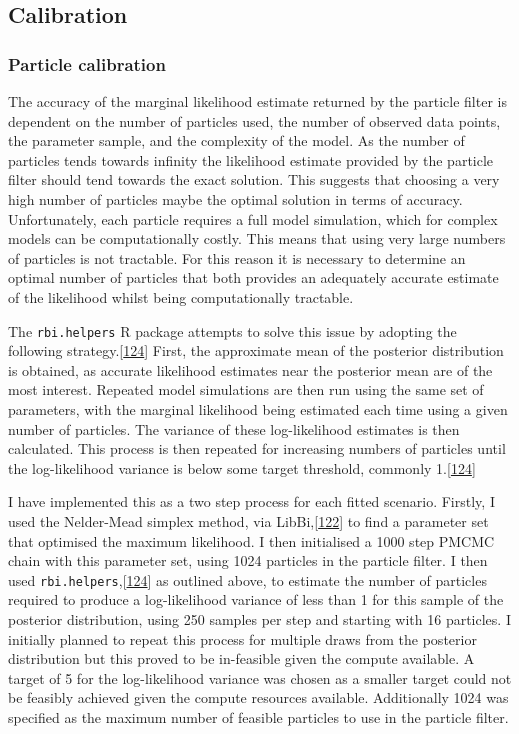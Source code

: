 \documentclass[11pt,twoside]{bristolthesis}
\begin{document}
  \hypertarget{calibration}{%
  \subsection{Calibration}\label{calibration}}
  
  \hypertarget{particle-calibration}{%
  \subsubsection{Particle calibration}\label{particle-calibration}}
  
  The accuracy of the marginal likelihood estimate returned by the particle filter is dependent on the number of particles used, the number of observed data points, the parameter sample, and the complexity of the model. As the number of particles tends towards infinity the likelihood estimate provided by the particle filter should tend towards the exact solution. This suggests that choosing a very high number of particles maybe the optimal solution in terms of accuracy. Unfortunately, each particle requires a full model simulation, which for complex models can be computationally costly. This means that using very large numbers of particles is not tractable. For this reason it is necessary to determine an optimal number of particles that both provides an adequately accurate estimate of the likelihood whilst being computationally tractable.
  
  The \texttt{rbi.helpers} R package attempts to solve this issue by adopting the following strategy.{[}\protect\hyperlink{ref-Funk:2019uw}{124}{]} First, the approximate mean of the posterior distribution is obtained, as accurate likelihood estimates near the posterior mean are of the most interest. Repeated model simulations are then run using the same set of parameters, with the marginal likelihood being estimated each time using a given number of particles. The variance of these log-likelihood estimates is then calculated. This process is then repeated for increasing numbers of particles until the log-likelihood variance is below some target threshold, commonly 1.{[}\protect\hyperlink{ref-Funk:2019uw}{124}{]}
  
  I have implemented this as a two step process for each fitted scenario. Firstly, I used the Nelder-Mead simplex method, via LibBi,{[}\protect\hyperlink{ref-Murray2015}{122}{]} to find a parameter set that optimised the maximum likelihood. I then initialised a 1000 step PMCMC chain with this parameter set, using 1024 particles in the particle filter. I then used \texttt{rbi.helpers},{[}\protect\hyperlink{ref-Funk:2019uw}{124}{]} as outlined above, to estimate the number of particles required to produce a log-likelihood variance of less than 1 for this sample of the posterior distribution, using 250 samples per step and starting with 16 particles. I initially planned to repeat this process for multiple draws from the posterior distribution but this proved to be in-feasible given the compute available. A target of 5 for the log-likelihood variance was chosen as a smaller target could not be feasibly achieved given the compute resources available. Additionally 1024 was specified as the maximum number of feasible particles to use in the particle filter.
  
\end{document}

